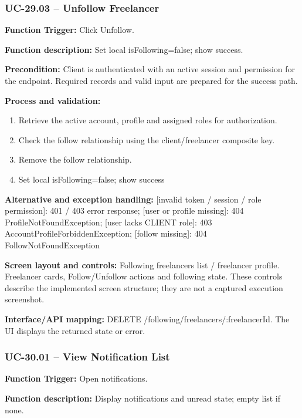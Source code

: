 \subsubsection{UC-29.03 -- Unfollow Freelancer}
\textbf{Function Trigger:} Click Unfollow.

\textbf{Function description:} Set local is\allowbreak{}Following=\allowbreak{}false; show success.

\textbf{Precondition:} Client is authenticated with an active session and permission for the endpoint. Required records and valid input are prepared for the success path.

\textbf{Process and validation:}
\begin{enumerate}
\item Retrieve the active account, profile and assigned roles for authorization.
\item Check the follow relationship using the client/\allowbreak{}freelancer composite key.
\item Remove the follow relationship.
\item Set local is\allowbreak{}Following=\allowbreak{}false; show success
\end{enumerate}
\textbf{Alternative and exception handling:} [invalid token /\allowbreak{} session /\allowbreak{} role permission]: 401 /\allowbreak{} 403 error response; [user or profile missing]: 404 Profile\allowbreak{}Not\allowbreak{}Found\allowbreak{}Exception; [user lacks CLIENT role]: 403 Account\allowbreak{}Profile\allowbreak{}Forbidden\allowbreak{}Exception; [follow missing]: 404 Follow\allowbreak{}Not\allowbreak{}Found\allowbreak{}Exception

\textbf{Screen layout and controls:} Following freelancers list /\allowbreak{} freelancer profile. Freelancer cards, Follow/\allowbreak{}Unfollow actions and following state. These controls describe the implemented screen structure; they are not a captured execution screenshot.

\textbf{Interface/\allowbreak{}API mapping:} DELETE /\allowbreak{}following/\allowbreak{}freelancers/\allowbreak{}:freelancer\allowbreak{}Id. The UI displays the returned state or error.

\subsubsection{UC-30.01 -- View Notification List}
\textbf{Function Trigger:} Open notifications.

\textbf{Function description:} Display notifications and unread state; empty list if none.

